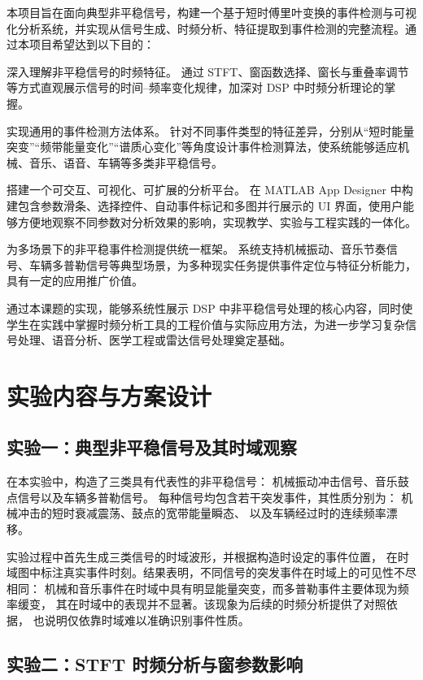 \documentclass{xjtureport}
\begin{document}
本项目旨在面向典型非平稳信号，构建一个基于短时傅里叶变换的事件检测与可视化分析系统，并实现从信号生成、时频分析、特征提取到事件检测的完整流程。通过本项目希望达到以下目的：

深入理解非平稳信号的时频特征。
通过 STFT、窗函数选择、窗长与重叠率调节等方式直观展示信号的时间–频率变化规律，加深对 DSP 中时频分析理论的掌握。

实现通用的事件检测方法体系。
针对不同事件类型的特征差异，分别从“短时能量突变”“频带能量变化”“谱质心变化”等角度设计事件检测算法，使系统能够适应机械、音乐、语音、车辆等多类非平稳信号。

搭建一个可交互、可视化、可扩展的分析平台。
在 MATLAB App Designer 中构建包含参数滑条、选择控件、自动事件标记和多图并行展示的 UI 界面，使用户能够方便地观察不同参数对分析效果的影响，实现教学、实验与工程实践的一体化。

为多场景下的非平稳事件检测提供统一框架。
系统支持机械振动、音乐节奏信号、车辆多普勒信号等典型场景，为多种现实任务提供事件定位与特征分析能力，具有一定的应用推广价值。

通过本课题的实现，能够系统性展示 DSP 中非平稳信号处理的核心内容，同时使学生在实践中掌握时频分析工具的工程价值与实际应用方法，为进一步学习复杂信号处理、语音分析、医学工程或雷达信号处理奠定基础。

\section{实验内容与方案设计}
\subsection{实验一：典型非平稳信号及其时域观察}

在本实验中，构造了三类具有代表性的非平稳信号：
机械振动冲击信号、音乐鼓点信号以及车辆多普勒信号。
每种信号均包含若干突发事件，其性质分别为：
机械冲击的短时衰减震荡、鼓点的宽带能量瞬态、
以及车辆经过时的连续频率漂移。

实验过程中首先生成三类信号的时域波形，并根据构造时设定的事件位置，
在时域图中标注真实事件时刻。结果表明，不同信号的突发事件在时域上的可见性不尽相同：
机械和音乐事件在时域中具有明显能量突变，而多普勒事件主要体现为频率缓变，
其在时域中的表现并不显著。该现象为后续的时频分析提供了对照依据，
也说明仅依靠时域难以准确识别事件性质。

\subsection{实验二：STFT 时频分析与窗参数影响}
\end{document}

